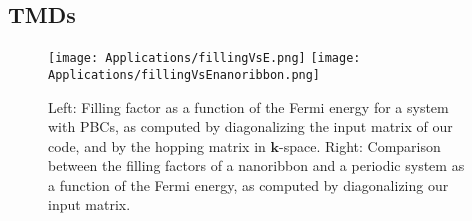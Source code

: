 \begin{table}[H]
\begin{tabular}{|c|c|c|c|}
	\end{tabular}
	\label{tab:dummytable}
\end{table}

\subsection{\acp{TMD}}
\label{subsec:apTMD}

\begin{figure}[H]
\texttt{[image: Applications/fillingVsE.png]}
\texttt{[image: Applications/fillingVsEnanoribbon.png]}
	\caption[Filling factor as a function of the Fermi energy for \acs{TMD} monolayers and nanoribbons.]{Left: Filling factor as a function of the Fermi energy for a system with \acp{PBC}, as computed by diagonalizing the input matrix of our code, and by the hopping matrix in $\bm k$-space.
	Right: Comparison between the filling factors of a nanoribbon and a periodic system as a function of the Fermi energy, as computed by diagonalizing our input matrix. }
	\label{fig:fillingVsE}
\end{figure}